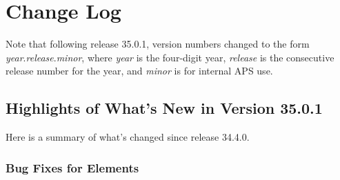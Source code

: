 \documentclass[11pt]{article}
\begin{document}
\newpage

\section{Change Log\label{sect:changeLog}}

Note that following release 35.0.1, version numbers changed to the form {\em year}.{\em release}.{\em minor},
where {\em year} is the four-digit year, {\em release} is the consecutive release number for the year,
and {\em minor} is for internal APS use.

\subsection{Highlights of What's New in Version 35.0.1}

Here is a summary of what's changed since release 34.4.0.

\subsubsection{Bug Fixes for Elements}
\end{document}
